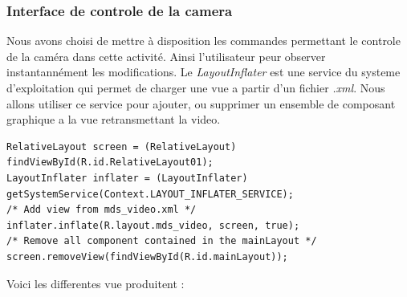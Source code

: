 \subsubsection{Interface de controle de la camera}
Nous avons choisi de mettre à disposition les commandes permettant le controle
de la caméra dans cette activité. Ainsi l'utilisateur peur observer instantannément les
modifications.\newline\newline
\indent Le \textit{LayoutInflater} est une service du systeme d'exploitation qui
permet de charger une vue a partir d'un fichier \textit{.xml}. Nous allons utiliser ce
service pour ajouter, ou supprimer un ensemble de composant graphique a la vue
retransmettant la video.
\begin{lstlisting}[caption={LayoutInflater utilisation}]
RelativeLayout screen = (RelativeLayout) findViewById(R.id.RelativeLayout01);
LayoutInflater inflater = (LayoutInflater) getSystemService(Context.LAYOUT_INFLATER_SERVICE);
/* Add view from mds_video.xml */
inflater.inflate(R.layout.mds_video, screen, true);
/* Remove all component contained in the mainLayout */
screen.removeView(findViewById(R.id.mainLayout));
\end{lstlisting}
Voici les differentes vue produitent :


